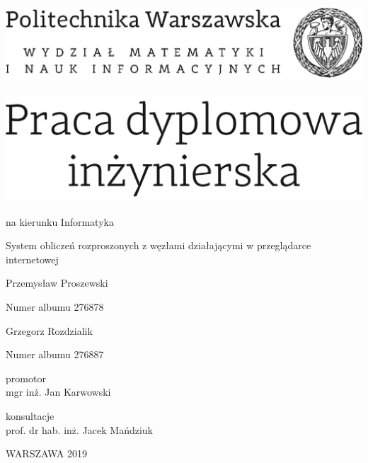 \documentclass[12pt,twoside,a4paper]{article}
\newcommand{\discipline}{Informatyka}
\renewcommand{\title}{System obliczeń rozproszonych z węzłami działającymi w przeglądarce internetowej}
\newcommand{\supervisor}{mgr inż. Jan Karwowski}
\renewcommand{\year}{2019}
\newcommand{\authori}{Przemysław Proszewski}
\newcommand{\albumi}{276878}
\newcommand{\authorii}{Grzegorz Rozdzialik}
\newcommand{\albumii}{276887}
\begin{document}
\pagestyle{empty}

\begin{center}

\includegraphics[scale=1.]{img/politechnika} 
\vspace{40pt}

\includegraphics[scale=1.]{img/praca_inz}  %

{ \arial na kierunku \discipline

\vspace{30pt}
{\arial \large \title}

\vspace{40pt}

{\arial \huge \authori }

\vspace{5pt}

Numer albumu \albumi

\vspace {20pt}
{\arial \huge \authorii}

\vspace{5pt}

Numer albumu \albumii

\vspace{40pt}

promotor \\
{\arial \supervisor}

\vspace{15pt}
 
konsultacje  \\
{\arial prof. dr hab. inż. Jacek Mańdziuk }

 \vfill
WARSZAWA \year \\
}
\end{center}


%
%
\end{document}

